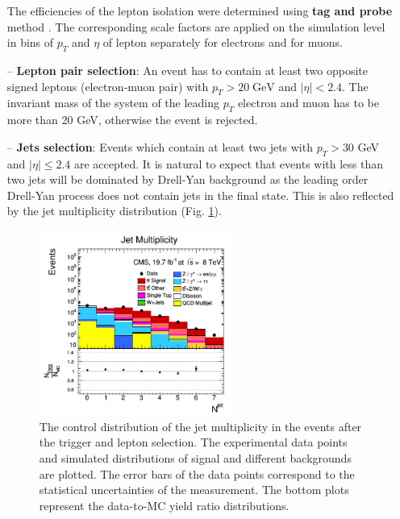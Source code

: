 \begin{itemize}
 The efficiencies of the lepton isolation were determined using \textbf{tag and probe} method \cite{TWikiTP}. The corresponding scale factors are applied on the
 simulation level in bins of $p_{T}$ and $\eta$ of lepton separately for electrons and for muons.
 \item [--] \textbf{Lepton pair selection}: An event has to contain at least two opposite signed leptons (electron-muon pair) with $p_{T} > 20 \; \textrm{GeV}$ and $|\eta| < 2.4$.
 The invariant mass of the system of the leading $p_{T}$ electron and muon has to be more than 20 GeV, otherwise the event is rejected. 
 \item [--] \textbf{Jets selection}: Events which contain at least two jets with $p_{T} > 30$ GeV and $|\eta| \leq 2.4$ are accepted. It is natural to expect
 that events with less than two jets will be dominated by Drell-Yan background as the leading order Drell-Yan process does not contain jets in the final state. This is also 
 reflected by the jet multiplicity distribution (Fig. \ref{fig:jetMultiSel}). 
 
 \begin{figure}[h]
  \centering
  \includegraphics[width=0.6\textwidth]{04_event_reconstruction/plots/JetMulti.png}
  \caption{The control distribution of the jet multiplicity in the events after the trigger and lepton selection. The experimental data points
  and simulated distributions of signal and different backgrounds are plotted. The error bars of the data points
 correspond to the statistical uncertainties of the measurement. The bottom plots represent the data-to-MC yield ratio distributions.}
  \label{fig:jetMultiSel}
 \end{figure}
 

\end{itemize}
